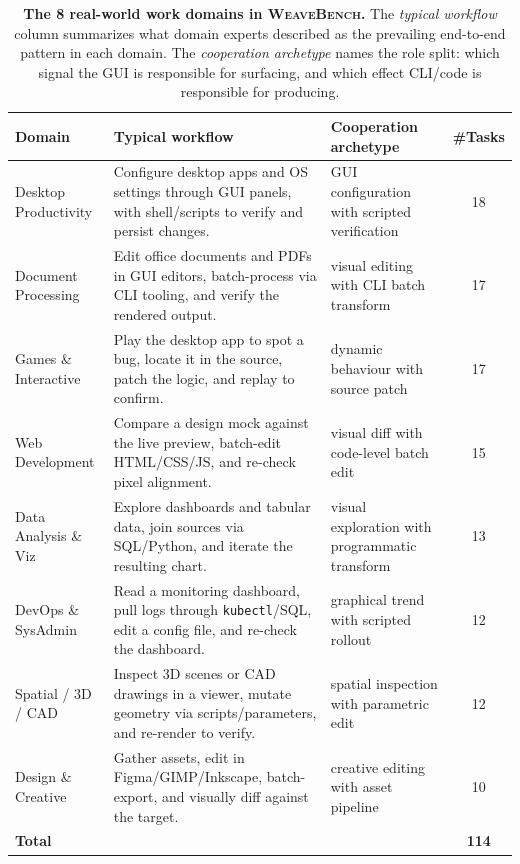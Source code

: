 \documentclass{llmxive}
\providecommand{\Eyeson}{\textsc{WeaveBench}\xspace}
\providecommand{\arraystretch}{1.2}
\begin{document}
\begin{table}[!htbp]
\centering
\footnotesize
\setlength{\tabcolsep}{6pt}
\renewcommand{\arraystretch}{1.2}
\begin{tabularx}{\textwidth}{@{}l X p{5.2cm} c@{}}
\toprule
\textbf{Domain} & \textbf{Typical workflow} & \textbf{Cooperation archetype} & \textbf{\#Tasks} \\
\midrule
Desktop Productivity & Configure desktop apps and OS settings through GUI panels, with shell/scripts to verify and persist changes.    & GUI configuration with scripted verification   & 18 \\
Document Processing  & Edit office documents and PDFs in GUI editors, batch-process via CLI tooling, and verify the rendered output.   & visual editing with CLI batch transform        & 17 \\
Games \& Interactive  & Play the desktop app to spot a bug, locate it in the source, patch the logic, and replay to confirm.            & dynamic behaviour with source patch            & 17 \\
Web Development      & Compare a design mock against the live preview, batch-edit HTML/CSS/JS, and re-check pixel alignment.           & visual diff with code-level batch edit         & 15 \\
Data Analysis \& Viz  & Explore dashboards and tabular data, join sources via SQL/Python, and iterate the resulting chart.              & visual exploration with programmatic transform & 13 \\
DevOps \& SysAdmin    & Read a monitoring dashboard, pull logs through \texttt{kubectl}/SQL, edit a config file, and re-check the dashboard. & graphical trend with scripted rollout          & 12 \\
Spatial / 3D / CAD   & Inspect 3D scenes or CAD drawings in a viewer, mutate geometry via scripts/parameters, and re-render to verify. & spatial inspection with parametric edit        & 12 \\
Design \& Creative    & Gather assets, edit in Figma/GIMP/Inkscape, batch-export, and visually diff against the target.                 & creative editing with asset pipeline           & 10 \\
\midrule
\textbf{Total}  &                                                                                                                  &                                                & \textbf{114} \\
\bottomrule
\end{tabularx}
\caption{\textbf{The 8 real-world work domains in \Eyeson{}.} The \emph{typical workflow} column summarizes what domain experts described as the prevailing end-to-end pattern in each domain. The \emph{cooperation archetype} names the role split: which signal the GUI is responsible for surfacing, and which effect CLI/code is responsible for producing.}
\label{tab:domains}
\end{table}
\end{document}
